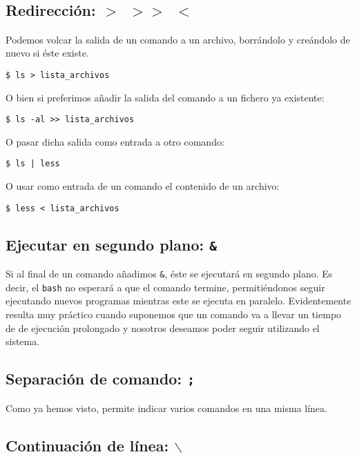 \subsection{Redirección: {\tt $>$ $>$$>$ $<$ \textbar}}

Podemos volcar  la salida  de un  comando a  un archivo,  borrándolo y
creándolo de nuevo si éste existe.

\begin{verbatim}
$ ls > lista_archivos
\end{verbatim}

O bien  si preferimos  añadir la  salida del comando  a un  fichero ya
existente:

\begin{verbatim}
$ ls -al >> lista_archivos
\end{verbatim}

O pasar dicha salida como entrada a otro comando:

\begin{verbatim}
$ ls | less
\end{verbatim}

O usar como entrada de un comando el contenido de un archivo:

\begin{verbatim}
$ less < lista_archivos
\end{verbatim}
        

\subsection{Ejecutar en segundo plano: {\tt \&}}

Si al  final de  un comando  añadimos {\tt \&},  éste se  ejecutará en
segundo plano.  Es decir, el {\tt  bash} no esperará a  que el comando
termine,  permitiéndonos seguir  ejecutando nuevos  programas mientras
este se ejecuta en paralelo. Evidentemente resulta muy práctico cuando
suponemos  que un  comando  va  a llevar  un  tiempo  de de  ejecución
prolongado y nosotros deseamos poder seguir utilizando el sistema.


\subsection{Separación de comando: {\tt ;}}

Como  ya hemos  visto, permite  indicar varios  comandos en  una misma
línea.


\subsection{Continuación de línea: {\tt $\backslash$}}


